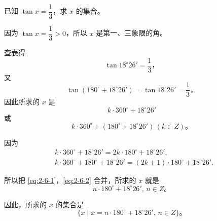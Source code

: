 \vspace{0.5em}
\liti 已知 $\tan x = \dfrac 1 3$，求 $x$ 的集合。
\vspace{0.5em}

\jie 因为 $\tan x = \dfrac 1 3 > 0$，所以 $x$ 是第一、三象限的角。

查表得
$$\tan 18^\circ 26' = \dfrac 1 3 \text{，}$$
又
$$\tan(180^\circ + 18^\circ 26') = \tan 18^\circ 26' = \dfrac 1 3 \text{，}$$
因此所求的 $x$ 是
$$k \cdot 360^\circ + 18^\circ 26'$$
或
$$k \cdot 360^\circ + (180^\circ + 18^\circ 26') \, (k \in Z) \text{。}$$

因为
\begin{align}
    &k \cdot 360^\circ + 18^\circ 26' = 2k \cdot 180^\circ + 18^\circ 26', \tag{1}\label{eq:2-6-1} \\
    &k \cdot 360^\circ + 180^\circ + 18^\circ 26' =  (2k + 1) \cdot 180^\circ + 18^\circ 26', \tag{2}\label{eq:2-6-2}
\end{align}

所以把 \eqref{eq:2-6-1}，\eqref{eq:2-6-2} 合并，所求的 $x$ 就是
$$n \cdot 180^\circ + 18^\circ 26', \, n \in Z \text{。}$$

因此，所求的 $x$ 的集合是
$$\{ x \mid x = n \cdot 180^\circ + 18^\circ 26', \, n \in Z \} \text{。}$$

